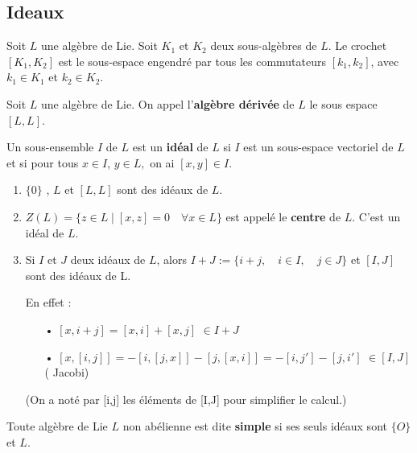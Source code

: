 \documentclass[a4paper,openany,12pt]{report}
\theoremstyle{break}
{\theorembodyfont{\upshape}
\newtheorem*{rmq}{Remarque :}
\newtheorem*{prv}{Preuve :}
\newtheorem*{ex}{Exemples :}
\newtheorem{exe}{Exemple : }
\newtheorem*{nota}{Notation :}}
\begin{document}
\subsection{Ideaux}

\begin{df}
\quad Soit $L$ une algèbre de Lie. Soit $K_1$ et $K_2$ deux sous-algèbres de $L$. Le crochet $[K_1,K_2]$ est le sous-espace engendré par tous les commutateurs $[k_1,k_2]$, avec $k_1 \in K_1$ et $k_2 \in K_2$.
\end{df}

\begin{df}
\quad Soit $L$ une algèbre de Lie. On appel l'\textbf{algèbre dérivée} de $L$ le sous espace $[L,L]$.
\end{df}

\begin{df}
\quad Un sous-ensemble $I$ de $L$ est un \textbf{idéal} de $L$ si $I$ est un sous-espace vectoriel de $L$ et si pour tous $x \in I$, $y \in L,$ on ai $[x, y] \in I$.
\end{df}

\begin{ex}
\begin{enumerate}
\item $\{0 \}$ , $L$ et $[L,L]$ sont des idéaux de $L$.

\item $Z(L) = \{ z \in L  \mid [x,z]=0 \quad \forall x \in L\}$ est appelé le \textbf{centre} de $L$. C'est un idéal de $L$.

\item Si $I$ et $J$ deux idéaux de $L$, alors $I+J:=\{i+j,\quad i\in I,\quad j\in J\}$ et $[I,J]$ sont des idéaux de L.

En effet :
\begin{itemize}
\item[•] $[x,i+j]=[x,i]+[x,j]$ $\in I+J$
\item[•]$[x,[i,j]]=-[i,[j,x]]-[j,[x,i]] = -[i,j']-[j,i']$ $\in [I,J]$ ( Jacobi)
\end{itemize}
(On a noté par [i,j] les éléments de [I,J] pour simplifier le calcul.)
\end{enumerate}
\end{ex}

\begin{df}
\quad Toute algèbre de Lie $L$ non abélienne est dite \textbf{simple} si ses seuls idéaux sont $\{O\}$ et $L$.
\end{df}
\end{document}
